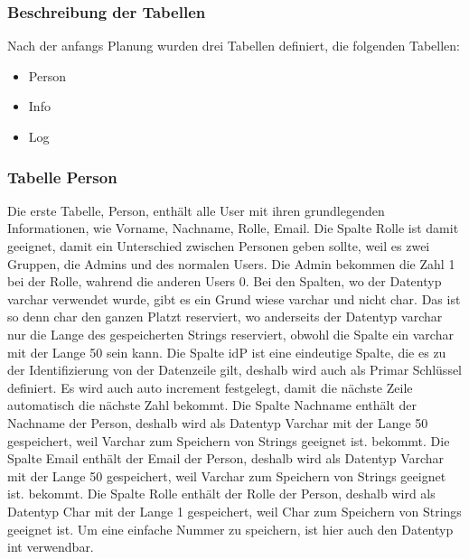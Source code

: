 \subsubsection{Beschreibung der Tabellen}
Nach der anfangs Planung wurden drei Tabellen definiert, die folgenden Tabellen:
\begin{itemize}
	\item Person
	\item Info
	\item Log
\end{itemize}
\subsubsection{Tabelle Person}
Die erste Tabelle, Person, enthält alle User mit ihren grundlegenden Informationen, wie Vorname, Nachname, Rolle, Email. Die Spalte Rolle ist damit geeignet, damit ein Unterschied zwischen Personen geben sollte, weil es zwei Gruppen, die Admins und des normalen Users. Die Admin bekommen die Zahl 1 bei der Rolle, wahrend die anderen Users 0. Bei den Spalten, wo der Datentyp varchar verwendet wurde, gibt es ein Grund wiese varchar und nicht char. Das ist so denn char den ganzen Platzt reserviert, wo anderseits der Datentyp varchar nur die Lange des gespeicherten Strings reserviert, obwohl die Spalte ein varchar mit der Lange 50 sein kann.
\bigbreak
Die Spalte idP ist eine eindeutige Spalte, die es zu der Identifizierung von der Datenzeile gilt, deshalb wird auch als Primar Schlüssel definiert. Es wird auch auto increment festgelegt, damit die nächste Zeile automatisch die nächste Zahl bekommt.
\bigbreak
Die Spalte Nachname enthält der Nachname der Person, deshalb wird als Datentyp Varchar mit der Lange 50 gespeichert, weil Varchar zum Speichern von Strings geeignet ist.
bekommt.
\bigbreak
Die Spalte Email enthält der Email der Person, deshalb wird als Datentyp Varchar mit der Lange 50 gespeichert, weil Varchar zum Speichern von Strings geeignet ist.
bekommt.
\bigbreak
Die Spalte Rolle enthält der Rolle der Person, deshalb wird als Datentyp Char mit der Lange 1 gespeichert, weil Char zum Speichern von Strings geeignet ist. Um eine einfache Nummer zu speichern, ist hier auch den Datentyp int verwendbar.

